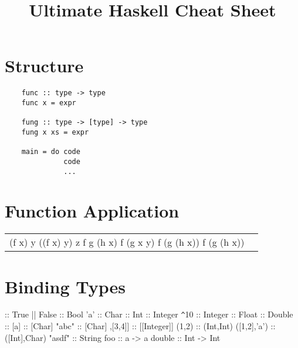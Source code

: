 \documentclass{refcard}
\title{Ultimate Haskell Cheat Sheet}
\begin{document}
\maketitle

\section{Structure}

\begin{verbatim}
	func :: type -> type
	func x = expr

	fung :: type -> [type] -> type
	fung x xs = expr

	main = do code
	          code
	          ...
\end{verbatim}


\section{Function Application}

\begin{tabular}{CC}
	\li[f x y] (f x) y
	\li[f x y z] ((f x) y) z
	\li[f g \$ h x] f g (h x)
	\li[f \$ g x y] f (g x y)
	\li[f \$ g \$ h x] f (g (h x))
	\li[(f .\s{}g .\s{}h) x] f (g (h x))
\end{tabular}


\section{Binding Types}

\begin{ldesc}
	               \s::\s{}
	\li[boolean]                True || False :: Bool
	\li[character]              'a' :: Char
	 :: Int
	 :: Integer
	\verb+^+10 :: Integer
	 :: Float 
	 :: Double
	\li[list]                   [] :: [a]
	\li[]                       ['a','b','c'] :: [Char]
	\li                         "abc" :: [Char]
	\li[]                       [[1,2],[3,4]] :: [[Integer]]
	\li[tuple]                  (1,2) :: (Int,Int)
	\li                         ([1,2],'a') :: ([Int],Char)
	\li[string]                 "asdf" :: String
	\li[functions]              foo :: a -> a
	\li                         double :: Int -> Int
\end{ldesc}
\end{document}
